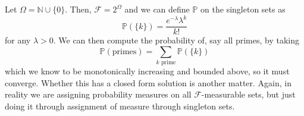 \documentclass{article}
\begin{document}
      \begin{example}
        Let $\Omega = \mathbb{N} \cup \{0\}$. Then, $\mathcal{F} = 2^\Omega$ and we can define $\mathbb{P}$ on the singleton sets as 
        \begin{equation}
          \mathbb{P}(\{k\}) = \frac{e^{-\lambda} \lambda^k}{k!}
        \end{equation}
        for any $\lambda > 0$. We can then compute the probability of, say all primes, by taking 
        \begin{equation}
          \mathbb{P}(\text{primes}) = \sum_{k \text{ prime}} \mathbb{P}(\{k\})
        \end{equation}
        which we know to be monotonically increasing and bounded above, so it must converge. Whether this has a closed form solution is another matter. Again, in reality we are assigning probability measures on all $\mathcal{F}$-measurable sets, but just doing it through assignment of measure through singleton sets. 
      \end{example}
\end{document}
